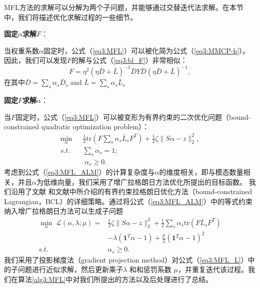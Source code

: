 MFL方法的求解可以分解为两个子问题，并能够通过交替迭代法求解。在本节中，我们将描述优化求解过程的一些细节。

    \textbf{固定$\alpha$求解$F$}：

当权重系数$\alpha$固定时，公式（\ref{eq3:MFL}）可以被化简为公式（\ref{eq3:MMCP-h}）。因此，我们可以发现$F$的解与公式（\ref{eq3:bl_F}）非常相似：
\begin{equation}
{F} = \eta^2(\eta\bar{{D}}+\bar{{L}})^{-1}\bar{{D}} {Y}\bar{{D}}(\eta\bar{{D}}+\bar{{L}})^{-1},
\label{eq3:MFL_F}
\end{equation}
在其中$  \bar{{D}} = \sum_s \alpha_s  \bar{{D}}_s $ and $  \bar{{L}} = \sum_s \alpha_s \bar{{L}}_s $

    \textbf{固定$F$求解$\alpha$}：

当$F$固定时，公式（\ref{eq3:MFL}）可以被变形为有界约束的二次优化问题（bound-constrained quadratic optimization problem）：
\begin{equation}
\begin{split}
\mathop{\mathrm{min}}_{{\alpha}}\;&\frac{1}{2}\mathrm{tr}({F} \sum_s\alpha_s\bar{{L}}_s{F}^T)+\frac{1}{2}\zeta\|{S}{\alpha} - {z}  \|_2^2,\\
s.t.\quad& \sum_s \alpha_s = 1;\\ &\; \alpha_s \ge 0.
\end{split}
\label{eq3:MFL_ALM}
\end{equation}    
考虑到公式（\ref{eq3:MFL_ALM}）的计算复杂度与$\alpha$的维度相关，即与模态数量相关，并且$\alpha$为低维向量，我们采用了增广拉格朗日方法\cite{bertsekas1982constrained}优化所提出的目标函数。
我们沿用了文献\parencite{nocedal2006numerical} 和文献\parencite{bertsekas1982constrained}中所介绍的有界约束拉格朗日优化方法（bound-constrained Lagrangian，BCL）的详细策略。通过将公式（\ref{eq3:MFL_ALM}）中的等式约束纳入增广拉格朗日方法可以生成子问题
\begin{equation}
\begin{split}
\mathop{\mathrm{min}}_{{\alpha}}\;\mathcal{L}({\alpha},\lambda;\mu) =&\frac{1}{2}\zeta\|{S}{\alpha} - {z}\|_2^2+\frac{1}{2}\sum_s\alpha_s\mathrm{tr}({F} \bar{{L}}_s{F}^T) \\
&- \lambda(\mathbf{1}^T{\alpha}-1)+\frac{\mu}{2}(\mathbf{1}^T{\alpha}-1)^2\\
s.t.\quad &\alpha_s \ge 0.
\end{split}
\label{eq3:MFL_L}
\end{equation}
我们采用了投影梯度法（gradient projection method）对公式（\ref{eq3:MFL_L}）中的子问题进行近似求解，然后更新乘子$ \lambda $ 和和惩罚系数 $ \mu $，并重复迭代该过程\cite{nocedal2006numerical,conn1992lancelot}。我们在算法\ref{alg3:MFL}中对我们所提出的方法以及后处理进行了总结。

